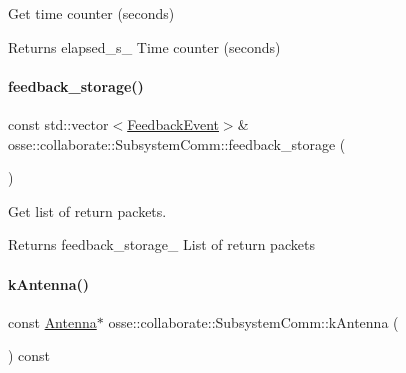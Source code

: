 Get time counter (seconds) 

\begin{DoxyReturn}{Returns}
elapsed\+\_\+s\+\_\+ Time counter (seconds) 
\end{DoxyReturn}
\mbox{\label{classosse_1_1collaborate_1_1_subsystem_comm_a99c728f5a45dc285197f5cd68708cb14}} 
\paragraph{\texorpdfstring{feedback\+\_\+storage()}{feedback\_storage()}}
{\footnotesize\ttfamily const std\+::vector$<$\hyperlink{structosse_1_1collaborate_1_1_subsystem_comm_1_1_feedback_event}{Feedback\+Event}$>$\& osse\+::collaborate\+::\+Subsystem\+Comm\+::feedback\+\_\+storage (\begin{DoxyParamCaption}{ }\end{DoxyParamCaption})\hspace{0.3cm}{\ttfamily [inline]}}



Get list of return packets. 

\begin{DoxyReturn}{Returns}
feedback\+\_\+storage\+\_\+ List of return packets 
\end{DoxyReturn}
\mbox{\label{classosse_1_1collaborate_1_1_subsystem_comm_a1279c0e9906325a8aff5a04de1af15d8}} 
\paragraph{\texorpdfstring{k\+Antenna()}{kAntenna()}}
{\footnotesize\ttfamily const \hyperlink{classosse_1_1collaborate_1_1_antenna}{Antenna}$\ast$ osse\+::collaborate\+::\+Subsystem\+Comm\+::k\+Antenna (\begin{DoxyParamCaption}{ }\end{DoxyParamCaption}) const\hspace{0.3cm}{\ttfamily [inline]}}



